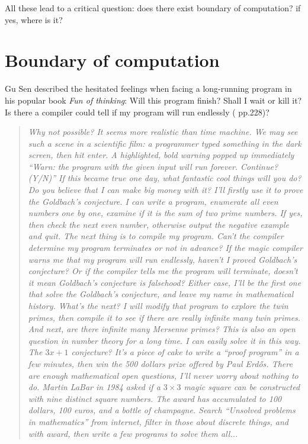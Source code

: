 \documentclass{article}
\begin{document}
All these lead to a critical question: does there exist boundary of computation? if yes, where is it?

\section{Boundary of computation}

Gu Sen described the hesitated feelings when facing a long-running program in his popular book {\em Fun of thinking}: Will this program finish? Shall I wait or kill it? Is there a compiler could tell if my program will run endlessly (\cite{GuSen-2012} pp.228)?

\begin{quotation}
\itshape
Why not possible? It seems more realistic than time machine. We may see such a scene in a scientific film: a programmer typed something in the dark screen, then hit enter. A highlighted, bold warning popped up immediately ``Warn: the program with the given input will run forever. Continue? (Y/N)'' If this became true one day, what fantastic cool things will you do? Do you believe that I can make big money with it? I'll firstly use it to prove the Goldbach's conjecture. I can write a program, enumerate all even numbers one by one, examine if it is the sum of two prime numbers. If yes, then check the next even number, otherwise output the negative example and quit. The next thing is to compile my program. Can't the compiler determine my program terminates or not in advance? If the magic compiler warns me that my program will run endlessly, haven't I proved Goldbach's conjecture? Or if the compiler tells me the program will terminate, doesn't it mean Goldbach's conjecture is falsehood? Either case, I'll be the first one that solve the Goldbach's conjecture, and leave my name in mathematical history. What's the next? I will modify that program to explore the twin primes, then compile it to see if there are really infinite many twin primes. And next, are there infinite many Mersenne primes? This is also an open question in number theory for a long time. I can easily solve it in this way. The $3x + 1$ conjecture? It's a piece of cake to write a ``proof program'' in a few minutes, then win the 500 dollars prize offered by Paul Erdős. There are enough mathematical open questions, I'll never worry about nothing to do. Martin LaBar in 1984 asked if a $3 \times 3$ magic square can be constructed with nine distinct square numbers. The award has accumulated to 100 dollars, 100 euros, and a bottle of champagne. Search ``Unsolved problems in mathematics'' from internet, filter in those about discrete things, and with award, then write a few programs to solve them all...
\end{quotation}
\end{document}
